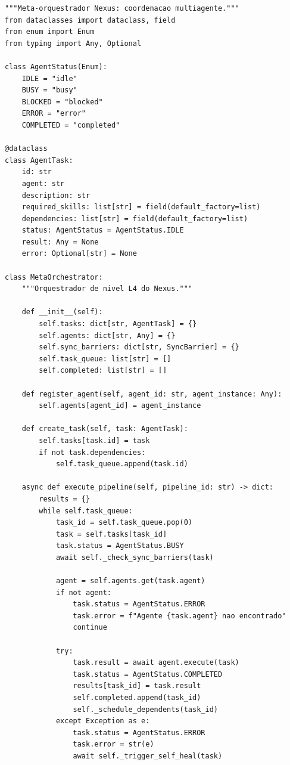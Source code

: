 \begin{lstlisting}[style=pythonstyle, caption={Meta-orquestrador Nexus},
                   label={lst:meta-orchestrator}]
"""Meta-orquestrador Nexus: coordenacao multiagente."""
from dataclasses import dataclass, field
from enum import Enum
from typing import Any, Optional

class AgentStatus(Enum):
    IDLE = "idle"
    BUSY = "busy"
    BLOCKED = "blocked"
    ERROR = "error"
    COMPLETED = "completed"

@dataclass
class AgentTask:
    id: str
    agent: str
    description: str
    required_skills: list[str] = field(default_factory=list)
    dependencies: list[str] = field(default_factory=list)
    status: AgentStatus = AgentStatus.IDLE
    result: Any = None
    error: Optional[str] = None

class MetaOrchestrator:
    """Orquestrador de nivel L4 do Nexus."""

    def __init__(self):
        self.tasks: dict[str, AgentTask] = {}
        self.agents: dict[str, Any] = {}
        self.sync_barriers: dict[str, SyncBarrier] = {}
        self.task_queue: list[str] = []
        self.completed: list[str] = []

    def register_agent(self, agent_id: str, agent_instance: Any):
        self.agents[agent_id] = agent_instance

    def create_task(self, task: AgentTask):
        self.tasks[task.id] = task
        if not task.dependencies:
            self.task_queue.append(task.id)

    async def execute_pipeline(self, pipeline_id: str) -> dict:
        results = {}
        while self.task_queue:
            task_id = self.task_queue.pop(0)
            task = self.tasks[task_id]
            task.status = AgentStatus.BUSY
            await self._check_sync_barriers(task)

            agent = self.agents.get(task.agent)
            if not agent:
                task.status = AgentStatus.ERROR
                task.error = f"Agente {task.agent} nao encontrado"
                continue

            try:
                task.result = await agent.execute(task)
                task.status = AgentStatus.COMPLETED
                results[task_id] = task.result
                self.completed.append(task_id)
                self._schedule_dependents(task_id)
            except Exception as e:
                task.status = AgentStatus.ERROR
                task.error = str(e)
                await self._trigger_self_heal(task)


\end{lstlisting}
